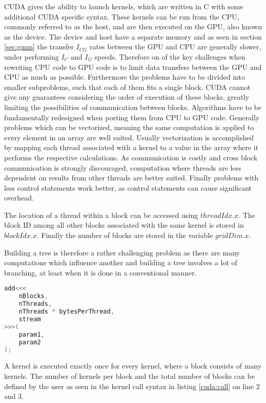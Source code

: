 \documentclass[]{article}
\begin{document}
CUDA gives the ability to launch kernels, which are written in C with some additional CUDA specific syntax. These kernels can be run from the CPU, commonly referred to as the host, and are then executed on the GPU, also known as the device. The device and host have a separate memory and as seen in section \ref{sec:gmm} the transfer $I_{CG}$ rates between the GPU and CPU are generally slower, under performing $I_{C}$ and $I_G$ speeds. Therefore on of the key challenges when rewriting CPU code to GPU code is to limit data transfers between the GPU and CPU as much as possible. Furthermore the problems have to be divided into smaller subproblems, such that each of them fits a single block. CUDA cannot give any guarantees considering the order of execution of these blocks, greatly limiting the possibilities of communication between blocks. Algorithms have to be fundamentally redesigned when porting them from CPU to GPU code. Generally problems which can be vectorized, meaning the same computation is applied to every element in an array are well suited. Usually vectorization is accomplished by mapping each thread associated with a kernel to a value in the array where it performs the respective calculations. As communication is costly and cross block communication is strongly discouraged, computation where threads are less dependent on results from other threads are better suited. Finally problems with less control statements work better, as control statements can cause significant overhead.

The location of a thread within a block can be accessed using $threadIdx.x$. The block ID among all other blocks associated with the same kernel is stored in $blockIdx.x$. Finally the number of blocks are stored in the variable $gridDim.x$. \cite{CUDAGuide}

Building a tree is therefore a rather challenging problem as there are many computations which influence another and building a tree involves a lot of branching, at least when it is done in a conventional manner.


\begin{lstlisting}[language=c++, caption=Calling a CUDA Kernel, label=cuda:call]
add<<<
	nBlocks,
	nThreads,
	nThreads * bytesPerThread,
	stream
>>>(
	param1,
	param2
);
\end{lstlisting}


A kernel is executed exactly once for every kernel, where a block consists of many kernels. The number of kernels per block and the total number of blocks can be defined by the user as seen in the kernel call syntax in listing \ref{cuda:call} on line 2 and 3. 
\end{document}
